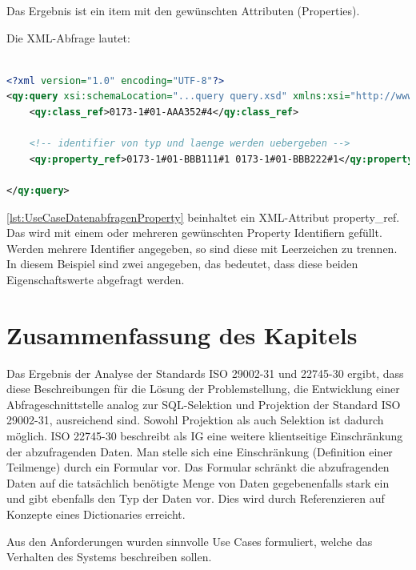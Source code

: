 Das Ergebnis ist ein \gls{item} mit den gewünschten Attributen (Properties). 

Die XML-Abfrage lautet:
\begin{lstlisting}[caption=Query Beispiel - Daten abfragen mit Propertyeinschränkung (Projektion), language=XML, label=lst:UseCaseDatenabfragenProperty]

<?xml version="1.0" encoding="UTF-8"?>
<qy:query xsi:schemaLocation="...query query.xsd" xmlns:xsi="http://www.w3.org/2001/XMLSchema-instance" xmlns:cat="...catalogue" xmlns:val="...value" xmlns:qy="...query" xmlns:bas="...basic">
	<qy:class_ref>0173-1#01-AAA352#4</qy:class_ref>
	
	<!-- identifier von typ und laenge werden uebergeben -->
	<qy:property_ref>0173-1#01-BBB111#1 0173-1#01-BBB222#1</qy:property_ref> 
	
</qy:query>
\end{lstlisting}

\autoref{lst:UseCaseDatenabfragenProperty} beinhaltet ein XML-Attribut property\_ref. Das wird mit einem oder mehreren gewünschten Property Identifiern gefüllt. Werden mehrere Identifier angegeben, so sind diese mit Leerzeichen zu trennen. In diesem Beispiel sind zwei angegeben, das bedeutet, dass diese beiden Eigenschaftswerte abgefragt werden.


\section{Zusammenfassung des Kapitels}

Das Ergebnis der Analyse der Standards ISO 29002-31 und 22745-30 ergibt, dass diese Beschreibungen für die Lösung der Problemstellung, die Entwicklung einer \gls{Abfrageschnittstelle} analog zur SQL-Selektion und Projektion der Standard ISO 29002-31, ausreichend sind. Sowohl Projektion als auch Selektion ist dadurch möglich. ISO 22745-30 beschreibt als \gls{IG} eine weitere klientseitige Einschränkung der abzufragenden Daten. Man stelle sich eine Einschränkung (Definition einer Teilmenge) durch ein Formular vor. Das Formular schränkt die abzufragenden Daten auf die tatsächlich benötigte Menge von Daten gegebenenfalls stark ein und gibt ebenfalls den Typ der Daten vor. Dies wird durch Referenzieren auf Konzepte eines Dictionaries erreicht.

Aus den Anforderungen wurden sinnvolle \glspl{Use Case} formuliert, welche das Verhalten des Systems beschreiben sollen.  
